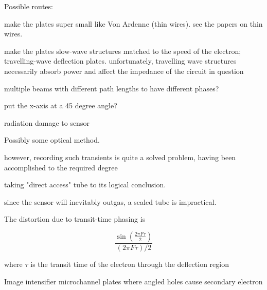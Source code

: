 \documentclass[paper.tex]{subfiles}
\begin{document}
Possible routes:

make the plates super small like Von Ardenne (thin wires). see the papers on thin wires.

make the plates slow-wave structures matched to the speed of the electron; travelling-wave deflection plates.
unfortunately, travelling wave structures necessarily absorb power and affect the impedance of the circuit in question


multiple beams with different path lengths to have different phases?

put the x-axis at a 45 degree angle?


radiation damage to sensor 

Possibly some optical method. 

however, recording such transients is quite a solved problem, having been accomplished to the required degree 

taking "direct access" tube to its logical conclusion.

since the sensor will inevitably outgas, a sealed tube is impractical.


The distortion due to transit-time phasing is

$$ \frac{\sin(\frac{2\pi F \tau}{2})}{(2\pi F \tau)/2} $$

where $\tau$ is the transit time of the electron through the deflection region 

Image intensifier microchannel plates where angled holes cause secondary electron 
\end{document}
